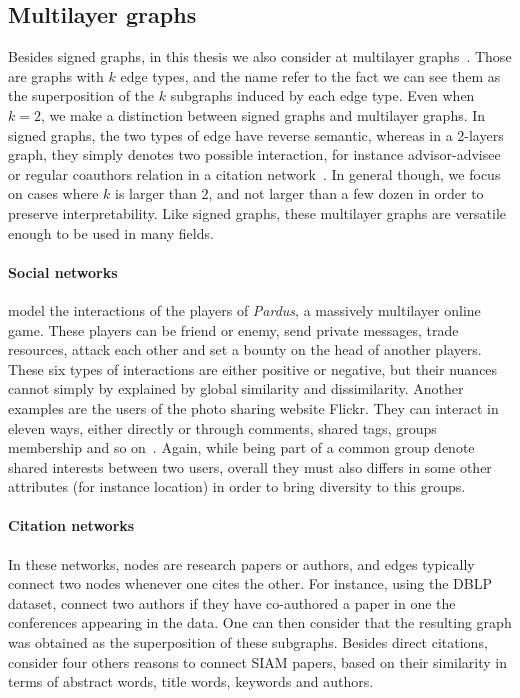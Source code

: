 

\subsection{Multilayer graphs}
\label{sub:intro_multilayer_graphs}

Besides signed graphs, in this thesis we also consider at multilayer
graphs~\autocites{Kivela2014}{multiSurvey14}. Those are graphs with $k$ edge types, and the name
refer to the fact we can see them as the superposition of the $k$ subgraphs induced by each edge
type. Even when $k=2$, we make a distinction between signed graphs and multilayer graphs. In signed
graphs, the two types of edge have reverse semantic, whereas in a 2-layers graph, they simply
denotes two possible interaction, for instance advisor-advisee or regular coauthors relation in a
citation network~\autocite{Advisor10}. In general though, we focus on cases where $k$ is larger than
$2$, and not larger than a few dozen in order to preserve interpretability.
Like signed graphs, these multilayer graphs are versatile enough to be used in many fields.

\paragraph{Social networks} \Textcite{Szell2010} model the interactions of the players of
\emph{Pardus}, a massively multilayer online game. These players can be friend or enemy, send
private messages, trade resources, attack each other and set a bounty on the head of another
players. These six types of interactions are either positive or negative, but their nuances cannot
simply by explained by global similarity and dissimilarity. Another examples are the users of the
photo sharing website Flickr.  They can interact in eleven ways, either directly or through
comments, shared tags, groups membership and so on~\autocite{RecoFlickrMulti11}. Again, while being
part of a common group denote shared interests between two users, overall they must also differs in
some other attributes (for instance location) in order to bring diversity to this groups.

\paragraph{Citation networks} In these networks, nodes are research papers or authors, and edges
typically connect two nodes whenever one cites the other. For instance, using the DBLP dataset,
\textcite{communityDBLPbyConf05} connect two authors if they have co-authored a paper in one the
 conferences appearing in the data. One can then consider that the resulting graph was
obtained as the superposition of these  subgraphs. Besides direct citations,
\textcite{articlesMultiSim11} consider four others reasons to connect  SIAM papers, based
on their similarity in terms of abstract words, title words, keywords and authors.

